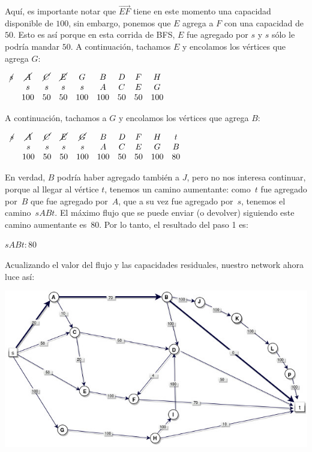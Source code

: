 \documentclass[10pt,a4paper]{article}
\begin{document}
Aquí, es importante notar que $\overrightarrow{EF}$ tiene en este momento una capacidad disponible de $100$, sin embargo, ponemos que $E$ agrega a $F$ con una capacidad de $50$. Esto es así porque en esta corrida de BFS, $E$ fue agregado por $s$ y $s$ sólo le podría mandar $50$. A continuación, tachamos $E$ y encolamos los vértices que agrega $G$:

$\begin{array}{ccccccccc} \cancel{s} & \cancel{A} & \cancel{C} & \cancel{E} &G & B &D & F & H\\ & s & s & s & s & A &C &E &G\\ & 100 & 50 & 50 & 100 & 100&50 &50 &100\\ \end{array}$

A continuación, tachamos a $G$ y encolamos los vértices que agrega $B$:

$\begin{array}{cccccccccc} \cancel{s} & \cancel{A} & \cancel{C} & \cancel{E} & \cancel{G} & B &D & F & H & t\\ & s & s & s & s & A &C &E &G & B\\ & 100 & 50 & 50 & 100 & 100&50 &50 &100 & 80\\ \end{array}$

En verdad, $B$ podría haber agregado también a $J$, pero no nos interesa continuar, porque al llegar al vértice $t$, tenemos un camino aumentante: como $t$ fue agregado por $B$ que fue agregado por $A$, que a su vez fue agregado por $s$, tenemos el camino $sABt$. El máximo flujo que se puede enviar (o devolver) siguiendo este camino aumentante es $80$. Por lo tanto, el resultado del paso 1 es:

\begin{center}
$sABt: 80$
\end{center}

Acualizando el valor del flujo y las capacidades residuales, nuestro network ahora luce así:

\begin{center}

    \begin{adjustbox}{max size={\textwidth}{\textheight}}
        \includegraphics{definitions/EK2.jpg}
        \end{adjustbox}
    
\end{center}
\end{document}
